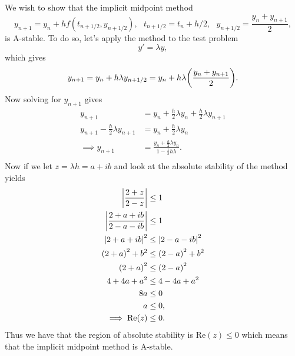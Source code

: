 \documentclass[12pt]{report}
\begin{document}
\begin{solution}

    \noindent
    We wish to show that the implicit midpoint method
    \[ 
        y_{n+1} = y_n + hf(t_{n + 1/2},y_{n + 1/2}), ~~~ t_{n + 1/2} = t_n + h/2, ~~~ y_{n + 1/2} = \frac{y_n + y_{n+1}}{2},
    \]
    is A-stable. To do so, let's apply the method to the test problem
    \[ 
        y' = \lambda y,
    \]
    which gives
    \[ 
        y_{n+1} = y_n + h\lambda y_{n+1/2} = y_n + h\lambda{\left(\frac{y_n + y_{n+1}}{2}\right)}.
    \]
    Now solving for $y_{n+1}$ gives
    \begin{align*}
        y_{n+1} &= y_n + \frac{h}{2}\lambda y_n + \frac{h}{2}\lambda y_{n+1}\\
        y_{n+1} -\frac{h}{2}\lambda y_{n+1} &= y_n + \frac{h}{2}\lambda y_n\\
        \implies y_{n+1} &= \frac{y_n + \frac{h}{2}\lambda y_n}{1 - \frac{1}{2}h\lambda}.\\
    \end{align*}
    Now if we let $z = \lambda h = a + ib$ and look at the absolute stability of the method yields
    \begin{align*}
        {\left| \frac{2 + z}{2 - z}\right|} &\leq 1\\
        {\left| \frac{2 + a + ib}{2 - a - ib}\right|} &\leq 1\\
        {\left|2 + a + ib\right|}^2 &\leq {\left|2 - a - ib\right|}^2\\ 
        {\left(2 + a\right)}^2 + b^2 &\leq {\left(2 - a\right)}^2 + b^2\\ 
        {\left(2 + a\right)}^2&\leq {\left(2 - a\right)}^2\\
        4 + 4a + a^2 &\leq 4 - 4a + a^2\\
        8a &\leq 0\\
        a &\leq  0,\\
        \implies \text{Re}(z) &\leq 0.
    \end{align*}  
    Thus we have that the region of absolute stability is $\text{Re}(z) \leq 0$ which means that the implicit midpoint method is A-stable.



\end{solution}

\newpage


\end{document}
